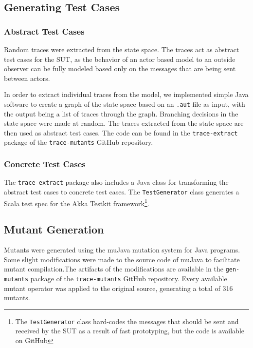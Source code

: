 \documentclass{article}
\begin{document}
		\subsection{Generating Test Cases}
			\label{sec:method_testgen}
			\subsubsection{Abstract Test Cases}
				\label{sec:method_abstract}
				Random traces were extracted from the state space. The traces act as abstract test cases for the SUT, as the behavior of an actor based model to an outside observer can be fully modeled based only on the messages that are being sent between actors.

				In order to extract individual traces from the \Rebeca model, we implemented simple Java software to create a graph of the state space based on an \texttt{.aut} file as input, with the output being a list of traces through the graph. Branching decisions in the state space were made at random. The traces extracted from the state space are then used as abstract test cases.
				The code can be found in the \texttt{trace-extract} package of the \texttt{trace-mutants} GitHub repository. \nocite{trace-mutants}

			\subsubsection{Concrete Test Cases}
				\label{sec:method_concrete}
				The \texttt{trace-extract} package also includes a Java class for transforming the abstract test cases to concrete test cases. The \texttt{TestGenerator} class generates a Scala test spec for the Akka Testkit framework\footnote{The \texttt{TestGenerator} class hard-codes the messages that should be sent and received by the SUT as a result of fast prototyping, but the code is available on GitHub}.

		\subsection{Mutant Generation}
			\label{sec:method_mutgen}
			Mutants were generated using the muJava \citet{mujava} mutation system for Java programs. Some slight modifications were made to the source code of muJava to facilitate mutant compilation.The artifacts of the modifications are available in the \texttt{gen-mutants} package of the \texttt{trace-mutants} GitHub repository. Every available mutant operator was applied to the original source, generating a total of 316 mutants.
\end{document}
